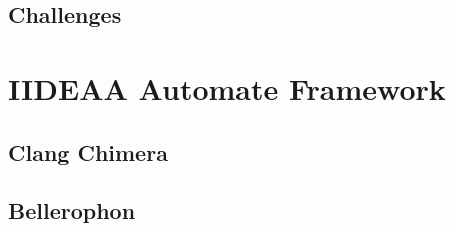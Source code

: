 \subsection{Challenges}

\section{IIDEAA Automate Framework} 

\subsection{Clang Chimera}

\subsection{Bellerophon}